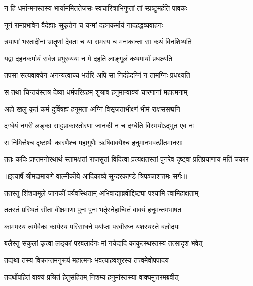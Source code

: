 \twolineshloka
{न हि धर्मान्मनस्तस्य भार्याममिततेजसः}
{स्वचारित्राभिगुप्तां तां स्प्रष्टुमर्हति पावकः} %

\twolineshloka
{नूनं रामप्रभावेन वैदेह्याः सुकृतेन च}
{यन्मां दहनकर्मायं नादहद्धव्यवाहनः} %

\twolineshloka
{त्रयाणां भरतादीनां भ्रातॄणां देवता च या}
{रामस्य च मनःकान्ता सा कथं विनशिष्यति} %

\twolineshloka
{यद्वा दहनकर्मायं सर्वत्र प्रभुरव्ययः}
{न मे दहति लाङ्गूलं कथमार्यां प्रधक्ष्यति} %

\twolineshloka
{तपसा सत्यवाक्येन अनन्यत्वाच्च भर्तरि}
{अपि सा निर्दहेदग्निं न तामग्निः प्रधक्ष्यति} %

\twolineshloka
{स तथा चिन्तयंस्तत्र देव्या धर्मपरिग्रहम्}
{शुश्राव हनुमान्वाक्यं चारणानां महात्मनाम्} %

\twolineshloka
{अहो खलु कृतं कर्म दुर्विषह्यं हनूमता}
{अग्निं विसृजताभीक्ष्णं भीमं राक्षससद्मनि} %

\twolineshloka
{दग्धेयं नगरी लङ्का साट्टप्राकारतोरणा}
{जानकी न च दग्धेति विस्मयोऽद्भुत एव नः} %

\twolineshloka
{स निमित्तैश्च दृष्टार्थैः कारणैश्च महागुणैः}
{ऋषिवाक्यैश्च हनुमानभवत्प्रीतमानसः} %

\fourlineindentedshloka
{ततः कपिः प्राप्तमनोरथार्थ}
{स्तामक्षतां राजसुतां विदित्वा}
{प्रत्यक्षतस्तां पुनरेव दृष्ट्वा}
{ प्रतिप्रयाणाय मतिं चकार} %


{॥इत्यार्षे श्रीमद्रामायणे वाल्मीकीये आदिकाव्ये सुन्दरकाण्डे त्रिपञ्चाशत्तमः सर्गः॥}


\twolineshloka
{ततस्तु शिंशपामूले जानकीं पर्यवस्थिताम्}
{अभिवाद्याब्रवीद्दिष्ट्या पश्यामि त्वामिहाक्षताम्} %

\twolineshloka
{ततस्तं प्रस्थितं सीता वीक्षमाणा पुनः पुनः}
{भर्तृस्नेहान्वितं वाक्यं हनूमन्तमभाषत} %

\twolineshloka
{काममस्य त्वमेवैकः कार्यस्य परिसाधने}
{पर्याप्तः परवीरघ्न यशस्यस्ते बलोदयः} %

\twolineshloka
{बलैस्तु संकुलां कृत्वा लङ्कां परबलार्दनः}
{मां नयेद्यदि काकुत्स्थस्तस्य तत्सादृशं भवेत्} %

\twolineshloka
{तद्यथा तस्य विक्रान्तमनुरूपं महात्मनः}
{भवत्याहवशूरस्य तत्त्वमेवोपपादय} %

\twolineshloka
{तदर्थोपहितं वाक्यं प्रश्रितं हेतुसंहितम्}
{निशम्य हनुमांस्तस्या वाक्यमुत्तरमब्रवीत्} %


